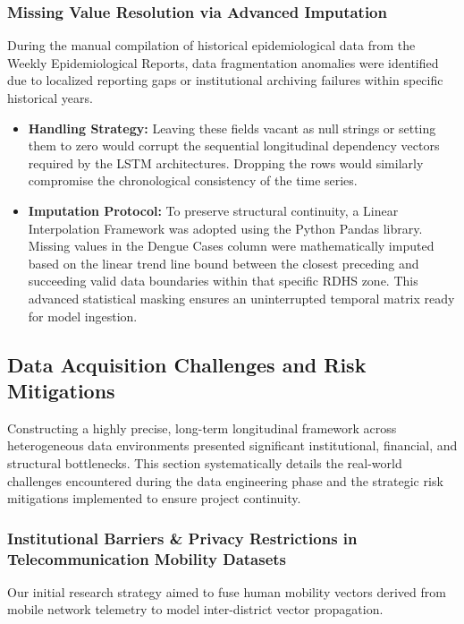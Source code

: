 \documentclass[12pt,a4paper]{article}
\begin{document}
\subsubsection{Missing Value Resolution via Advanced Imputation}
During the manual compilation of historical epidemiological data from the Weekly Epidemiological Reports, data fragmentation anomalies were identified due to localized reporting gaps or institutional archiving failures within specific historical years.

\begin{itemize}
    \item \textbf{Handling Strategy:} Leaving these fields vacant as null strings or setting them to zero would corrupt the sequential longitudinal dependency vectors required by the LSTM architectures. Dropping the rows would similarly compromise the chronological consistency of the time series.
    \item \textbf{Imputation Protocol:} To preserve structural continuity, a Linear Interpolation Framework was adopted using the Python Pandas library. Missing values in the Dengue Cases column were mathematically imputed based on the linear trend line bound between the closest preceding and succeeding valid data boundaries within that specific RDHS zone. This advanced statistical masking ensures an uninterrupted temporal matrix ready for model ingestion.
\end{itemize}

\subsection{Data Acquisition Challenges and Risk Mitigations}
Constructing a highly precise, long-term longitudinal framework across heterogeneous data environments presented significant institutional, financial, and structural bottlenecks. This section systematically details the real-world challenges encountered during the data engineering phase and the strategic risk mitigations implemented to ensure project continuity.

\subsubsection{Institutional Barriers \& Privacy Restrictions in Telecommunication Mobility Datasets}
Our initial research strategy aimed to fuse human mobility vectors derived from mobile network telemetry to model inter-district vector propagation.
\end{document}
